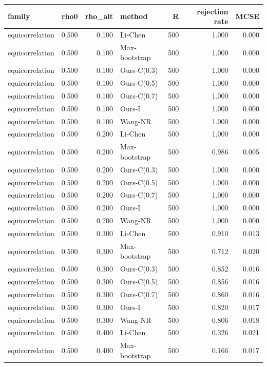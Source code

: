 \begin{tabular}{lrrlrrr}
\toprule
family & rho0 & rho\_alt & method & R & rejection rate & MCSE \\
\midrule
equicorrelation & 0.500 & 0.100 & Li-Chen & 500 & 1.000 & 0.000 \\
equicorrelation & 0.500 & 0.100 & Max-bootstrap & 500 & 1.000 & 0.000 \\
equicorrelation & 0.500 & 0.100 & Ours-C(0.3) & 500 & 1.000 & 0.000 \\
equicorrelation & 0.500 & 0.100 & Ours-C(0.5) & 500 & 1.000 & 0.000 \\
equicorrelation & 0.500 & 0.100 & Ours-C(0.7) & 500 & 1.000 & 0.000 \\
equicorrelation & 0.500 & 0.100 & Ours-I & 500 & 1.000 & 0.000 \\
equicorrelation & 0.500 & 0.100 & Wang-NR & 500 & 1.000 & 0.000 \\
equicorrelation & 0.500 & 0.200 & Li-Chen & 500 & 1.000 & 0.000 \\
equicorrelation & 0.500 & 0.200 & Max-bootstrap & 500 & 0.986 & 0.005 \\
equicorrelation & 0.500 & 0.200 & Ours-C(0.3) & 500 & 1.000 & 0.000 \\
equicorrelation & 0.500 & 0.200 & Ours-C(0.5) & 500 & 1.000 & 0.000 \\
equicorrelation & 0.500 & 0.200 & Ours-C(0.7) & 500 & 1.000 & 0.000 \\
equicorrelation & 0.500 & 0.200 & Ours-I & 500 & 1.000 & 0.000 \\
equicorrelation & 0.500 & 0.200 & Wang-NR & 500 & 1.000 & 0.000 \\
equicorrelation & 0.500 & 0.300 & Li-Chen & 500 & 0.910 & 0.013 \\
equicorrelation & 0.500 & 0.300 & Max-bootstrap & 500 & 0.712 & 0.020 \\
equicorrelation & 0.500 & 0.300 & Ours-C(0.3) & 500 & 0.852 & 0.016 \\
equicorrelation & 0.500 & 0.300 & Ours-C(0.5) & 500 & 0.856 & 0.016 \\
equicorrelation & 0.500 & 0.300 & Ours-C(0.7) & 500 & 0.860 & 0.016 \\
equicorrelation & 0.500 & 0.300 & Ours-I & 500 & 0.820 & 0.017 \\
equicorrelation & 0.500 & 0.300 & Wang-NR & 500 & 0.806 & 0.018 \\
equicorrelation & 0.500 & 0.400 & Li-Chen & 500 & 0.326 & 0.021 \\
equicorrelation & 0.500 & 0.400 & Max-bootstrap & 500 & 0.166 & 0.017 \\

\end{tabular}
